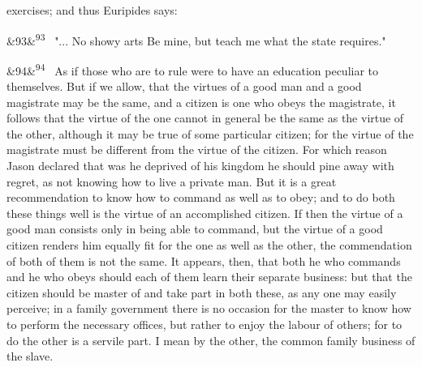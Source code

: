 \documentclass[12pt]{article}
\newcommand{\para}[1][]{\par\noindent\ifx&#1&\else\textsuperscript{\footnotesize #1}~\fi}
\begin{document}
exercises; and thus Euripides says:

\para[93] "... No showy arts Be mine, but teach me what the state requires."

\para[94] As if those who are to rule were to have an education peculiar to themselves. But if we allow, that the virtues of a good man and a good magistrate may be the same, and a citizen is one who obeys the magistrate, it follows that the virtue of the one cannot in general be the same as the virtue of the other, although it may be true of some particular citizen; for the virtue of the magistrate must be different from the virtue of the citizen. For which reason Jason declared that was he deprived of his kingdom he should pine away with regret, as not knowing how to live a private man. But it is a great recommendation to know how to command as well as to obey; and to do both these things well is the virtue of an accomplished citizen. If then the virtue of a good man consists only in being able to command, but the virtue of a good citizen renders him equally fit for the one as well as the other, the commendation of both of them is not the same. It appears, then, that both he who commands and he who obeys should each of them learn their separate business: but that the citizen should be master of and take part in both these, as any one may easily perceive; in a family government there is no occasion for the master to know how to perform the necessary offices, but rather to enjoy the labour of others; for to do the other is a servile part. I mean by the other, the common family business of the slave.
\end{document}
